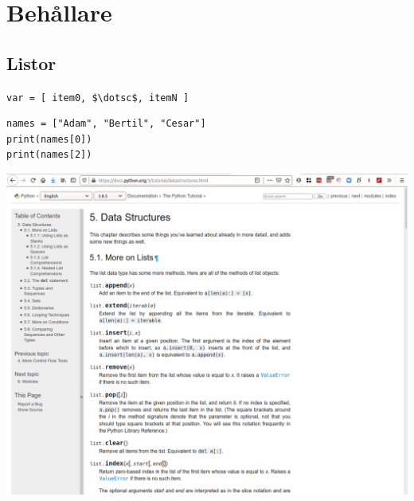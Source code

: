 \mode*

\section{Behållare}

\subsection{Listor}

\begin{frame}[fragile]
  \lstinline[basicstyle=\huge,mathescape]{var = [ item0, $\dotsc$, itemN ]}
\end{frame}

\begin{frame}[fragile]
  \begin{example}
    \begin{lstlisting}
names = ["Adam", "Bertil", "Cesar"]
print(names[0])
print(names[2])
    \end{lstlisting}
  \end{example}
\end{frame}

\begin{frame}
  \includegraphics[width=\columnwidth]{figs/docs-lists.png}
\end{frame}

\begin{frame}[fragile]
  \begin{example}
    
  \end{example}
\end{frame}

